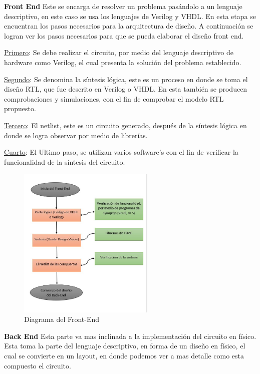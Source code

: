  \textbf{Front End}
 Este se encarga de resolver un problema pasándolo a un lenguaje descriptivo, en este caso se usa los lenguajes de Verilog y VHDL. 
 En esta etapa se encuentran los pasos necesarios para la arquitectura de diseño. A continuación se logran ver los pasos necesarios para que se pueda elaborar el diseño front end.
 
 \underline{Primero}: Se debe realizar el circuito, por medio del lenguaje descriptivo de hardware como Verilog, el cual presenta la solución del problema establecido.
 
 \underline{Segundo}:  Se denomina la síntesis lógica, este es un proceso en donde se toma el diseño RTL, que fue descrito en Verilog o VHDL. En esta también se producen comprobaciones y simulaciones, con el fin de comprobar el modelo RTL propuesto.
 
 \underline{Tercero}: El netlist, este es un circuito generado, después de la síntesis lógica en donde se logra observar  por medio de librerías.
 
 \underline{Cuarto}: El Ultimo paso, se utilizan varios software's con el fin de verificar la funcionalidad de la síntesis del circuito.

 \cite{charls} 


 \begin{figure}[h]
    \centering
    \includegraphics[width=0.58\textwidth]{figuras/Font.JPG}
    \caption{Diagrama del Front-End}
    \label{fig:mesh1}
\end{figure}
 
 

 
 
  \textbf{Back End} 
Esta parte va mas inclinada a la implementación del circuito en físico. Esta toma la parte del lenguaje descriptivo, en forma de un diseño en físico, el cual se convierte en un layout, en donde podemos ver a mas detalle como esta compuesto el circuito.

